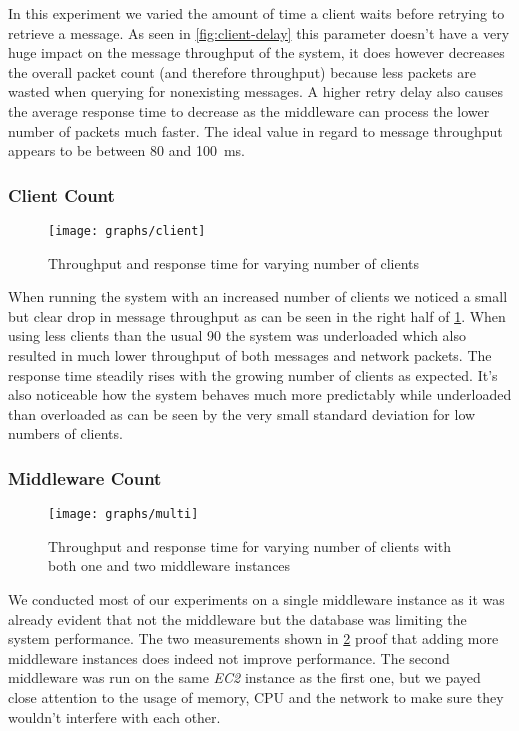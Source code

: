 \documentclass[a4paper, oneside]{csthesis}
\begin{document}
    In this experiment we varied the amount of time a client waits before retrying to retrieve a message.
    As seen in \cref{fig:client-delay} this parameter doesn't have a very huge impact on the message throughput
    of the system, it does however decreases the overall packet count (and therefore throughput) because
    less packets are wasted when querying for nonexisting messages. A higher retry delay also causes the
    average response time to decrease as the middleware can process the lower number of packets much faster.
    The ideal value in regard to message throughput appears to be between 80 and \SI{100}{\milli\second}.

\newpage
\subsubsection{Client Count}
    \begin{figure}[ht]
    \centering
        \texttt{[image: graphs/client]}
        \caption{Throughput and response time for varying number of clients}
        \label{fig:client}
    \end{figure}
    
    When running the system with an increased number of clients we noticed a small but clear drop in 
    message throughput as can be seen in the right half of \cref{fig:client}. When using less clients
    than the usual 90 the system was underloaded which also resulted in much lower throughput of both
    messages and network packets. The response time steadily rises with the growing number of clients
    as expected. It's also noticeable how the system behaves much more predictably while underloaded
    than overloaded as can be seen by the very small standard deviation for low numbers of clients.
    
\newpage
\subsubsection{Middleware Count}
    \begin{figure}[ht]
    \centering
        \texttt{[image: graphs/multi]}
        \caption{Throughput and response time for varying number of clients with both one and two middleware instances}
        \label{fig:multi}
    \end{figure}
    
    We conducted most of our experiments on a single middleware instance as it was already evident
    that not the middleware but the database was limiting the system performance. The two measurements
    shown in \cref{fig:multi} proof that adding more middleware instances does indeed not improve
    performance. The second middleware was run on the same {\it EC2} instance as the first one, but
    we payed close attention to the usage of memory, CPU and the network to make sure they wouldn't
    interfere with each other.
 
\end{document}
